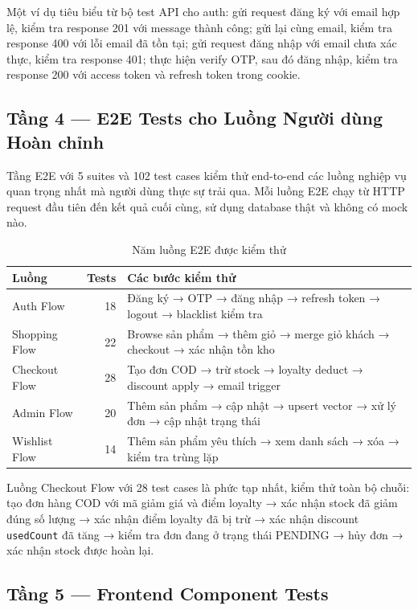 Một ví dụ tiêu biểu từ bộ test API cho auth: gửi request đăng ký với email hợp lệ, kiểm tra response 201 với message thành công; gửi lại cùng email, kiểm tra response 400 với lỗi email đã tồn tại; gửi request đăng nhập với email chưa xác thực, kiểm tra response 401; thực hiện verify OTP, sau đó đăng nhập, kiểm tra response 200 với access token và refresh token trong cookie.

\subsection{Tầng 4 — E2E Tests cho Luồng Người dùng Hoàn chỉnh}

Tầng E2E với 5 suites và 102 test cases kiểm thử end-to-end các luồng nghiệp vụ quan trọng nhất mà người dùng thực sự trải qua. Mỗi luồng E2E chạy từ HTTP request đầu tiên đến kết quả cuối cùng, sử dụng database thật và không có mock nào.

\begin{table}[H]
\centering
\caption{Năm luồng E2E được kiểm thử}
\label{tab:e2e-flows}
\begin{tabular}{|l|r|p{8cm}|}
\hline
\textbf{Luồng} & \textbf{Tests} & \textbf{Các bước kiểm thử} \\
\hline
Auth Flow & 18 & Đăng ký → OTP → đăng nhập → refresh token → logout → blacklist kiểm tra \\
\hline
Shopping Flow & 22 & Browse sản phẩm → thêm giỏ → merge giỏ khách → checkout → xác nhận tồn kho \\
\hline
Checkout Flow & 28 & Tạo đơn COD → trừ stock → loyalty deduct → discount apply → email trigger \\
\hline
Admin Flow & 20 & Thêm sản phẩm → cập nhật → upsert vector → xử lý đơn → cập nhật trạng thái \\
\hline
Wishlist Flow & 14 & Thêm sản phẩm yêu thích → xem danh sách → xóa → kiểm tra trùng lặp \\
\hline
\end{tabular}
\end{table}

Luồng Checkout Flow với 28 test cases là phức tạp nhất, kiểm thử toàn bộ chuỗi: tạo đơn hàng COD với mã giảm giá và điểm loyalty → xác nhận stock đã giảm đúng số lượng → xác nhận điểm loyalty đã bị trừ → xác nhận discount \texttt{usedCount} đã tăng → kiểm tra đơn đang ở trạng thái PENDING → hủy đơn → xác nhận stock được hoàn lại.

\subsection{Tầng 5 — Frontend Component Tests}

